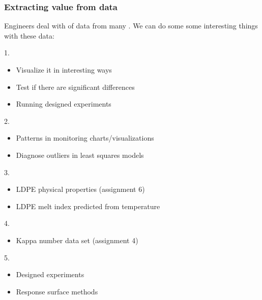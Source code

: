 \begin{frame}\frametitle{Extracting value from data}

	Engineers deal with {\color{purple}{large quantities}} of data from many {\color{purple}{different sources}}. We can do some some interesting {} things with these data:
	
	\vspace{6pt}
	{\footnotesize
	1. {\color{myOrange}{Improve process understanding }}
	\begin{itemize}
		\item	Visualize it in interesting ways
		\item	Test if there are significant differences
		\item	Running designed experiments
	\end{itemize}
	2. {\color{myOrange}{Troubleshooting process problems}}
	\begin{itemize}
		\item	Patterns in monitoring charts/visualizations
		\item	Diagnose outliers in least squares models
	\end{itemize}
	3. {\color{myOrange}{Predictive modelling }}
	\begin{itemize}
		\item	LDPE physical properties (assignment 6)
		\item	LDPE melt index predicted from temperature
	\end{itemize}
	4. {\color{myOrange}{Process monitoring }}
	\begin{itemize}
		\item	Kappa number data set (assignment 4)
	\end{itemize}
	5. {\color{myOrange}{Process optimization and improvement }}
	\begin{itemize}
		\item	Designed experiments
		\item	Response surface methods
	\end{itemize}}
\end{frame}

